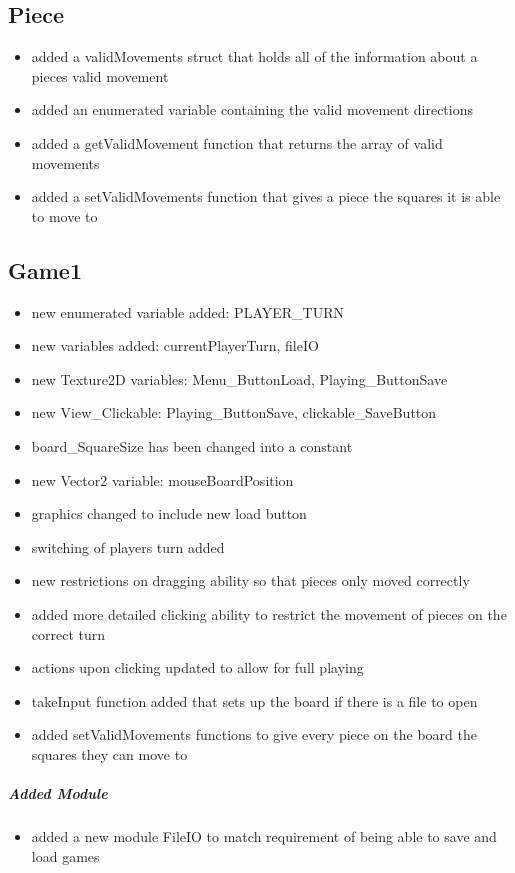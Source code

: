 \documentclass[10pt]{article}
\begin{document}
	\subsection{Piece}
	\begin{itemize}
	\item added a validMovements struct that holds all of the information about a pieces valid movement
	\item added an enumerated variable containing the valid movement directions
	\item added a getValidMovement function that returns the array of valid movements
	\item added a setValidMovements function that gives a piece the squares it is able to move to	
	\end{itemize}
	
	\subsection{Game1}	
	\begin{itemize}
	\item new enumerated variable added: PLAYER\_TURN
	\item new variables added: currentPlayerTurn, fileIO 
	\item new Texture2D variables: Menu\_ButtonLoad, Playing\_ButtonSave
	\item new View\_Clickable: Playing\_ButtonSave, clickable\_SaveButton
	\item board\_SquareSize has been changed into a constant
	\item new Vector2 variable: mouseBoardPosition
	\item graphics changed to include new load button 
	\item switching of players turn added
	\item new restrictions on dragging ability so that pieces only moved correctly
	\item added more detailed clicking ability to restrict the movement of pieces on the correct turn
	\item actions upon clicking updated to allow for full playing
	\item takeInput function added that sets up the board if there is a file to open
	\item added setValidMovements functions to give every piece on the board the squares they can move to	
	\end{itemize}	
	
	\subparagraph{Added Module}
	\begin{itemize}
	\item added a new module FileIO to match requirement of being able to save and load games
	\end{itemize}
\newpage
\end{document}
